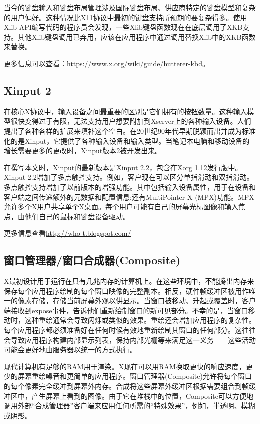 当今的键盘输入和键盘布局管理涉及国际键盘布局、供应商特定的键盘模型和复杂的用户偏好。这种情况比X11协议中最初的键盘支持所预期的要复杂得多。使用Xlib API编写代码的程序员会发现，一些Xlib键盘函数现在在底层调用了XKB支持。其他Xlib键盘调用已弃用，应该在应用程序中通过调用替换Xlib中的XKB函数来替换。

\noindent 更多信息可以查看：\url{https://www.x.org/wiki/guide/hutterer-kbd}。

\subsection{Xinput 2}

在核心X协议中，输入设备之间最重要的区别是它们拥有的按钮数量。这种输入模型很快变得过于有限，无法支持用户想要附加到Xserver上的各种输入设备。人们提出了各种各样的扩展来填补这个空白。在20世纪90年代早期脱颖而出并成为标准化的是Xinput，它提供了各种输入设备和输入类型。当笔记本电脑和移动设备的增长需要更多的更改时，Xinput版本2被开发出来。

在撰写本文时，Xinput的最新版本是Xinput 2.2，包含在Xorg 1.12发行版中。Xinput 2.2增加了多点触控支持。例如，客户现在可以区分单指滑动和双指滑动。多点触控支持增加了以前版本的增强功能。其中包括输入设备属性，用于在设备和客户端之间传递额外的元数据和配置信息;还有MultiPointer X (MPX)功能。MPX允许多个X用户共享单个X桌面。每个用户可能有自己的屏幕光标图像和输入焦点，由他们自己的鼠标和键盘设备驱动。

\noindent 更多信息查看\url{http://who-t.blogspot.com/}

\subsection{窗口管理器/窗口合成器(Composite)}

X最初设计用于运行在只有几兆内存的计算机上。在这些环境中，不能腾出内存来保存每个应用程序绘制的每个窗口映像的完整副本。相反，硬件帧缓冲区被用作唯一的像素存储，存储当前屏幕外观以供显示。当窗口被移动、升起或覆盖时，客户端接收到expose事件，告诉他们重新绘制窗口的新可见部分。不幸的是，当窗口移动时，这种重绘通常会导致闪烁或类似的效果。重绘还会增加应用程序的复杂性。每个应用程序都必须准备好在任何时候有效地重新绘制其窗口的任何部分。这往往会导致应用程序构建内部显示列表，保持内部光栅等来满足这一义务——这些活动可能会更好地由服务器以统一的方式执行。

现代计算机有足够的RAM用于渲染。X现在可以用RAM换取更快的响应速度，更少的屏幕重绘噪音和更简单的应用程序。窗口管理器(Composite)允许将每个窗口的每个像素完全缓冲到屏幕外内存。合成将这些屏幕外缓冲区根据需要组合到帧缓冲区中，产生屏幕上看到的图像。由于它在堆栈中的位置，Composite可以方便地调用外部“合成管理器”客户端来应用任何所需的“特殊效果”，例如，半透明、模糊或阴影。

